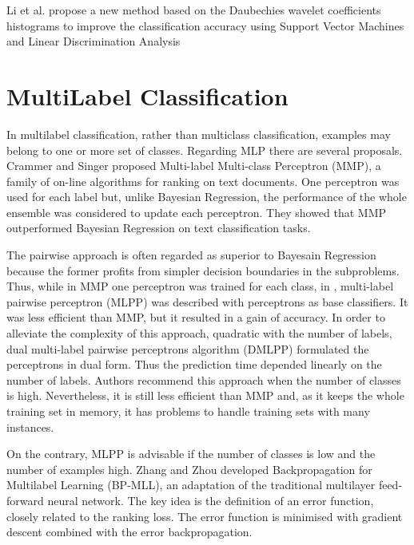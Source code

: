 Li et al. \cite{Li2003} propose a new method based on the Daubechies wavelet coefficients histograms
to improve the classification accuracy using Support Vector Machines and Linear Discrimination Analysis


\section{MultiLabel Classification}
\label{multilabelclassification}

In multilabel classification, rather than multiclass classification, 
examples may belong to one or more set of classes. Regarding MLP there are several proposals.
Crammer and Singer \cite{Crammer2003} proposed Multi-label Multi-class Perceptron (MMP), a
family of on-line algorithms for ranking on text documents. 
One perceptron was used for each label but, unlike Bayesian Regression, the performance of the whole ensemble
was considered to update each perceptron. They showed that MMP outperformed
Bayesian Regression on text classification tasks.

The pairwise approach is often regarded as superior to Bayesain Regression because the former profits from simpler decision boundaries in the subproblems. 
Thus, while in MMP one perceptron was trained for each class, in \cite{Mencia2009}, multi-label pairwise perceptron (MLPP) was described with perceptrons as base classifiers. 
It was less efficient than MMP, but it resulted in a gain of accuracy.
In order to alleviate the complexity of this approach, quadratic with the number of labels, dual multi-label pairwise perceptrons algorithm (DMLPP) \cite{LozaMencia2008} formulated the perceptrons in dual form. 
Thus the prediction time depended linearly on the number of labels. 
Authors recommend this approach when the number of classes is high. 
Nevertheless, it is still less efficient than MMP and, as it keeps the whole training set in memory, it has problems to
handle training sets with many instances. 


On the contrary, MLPP is advisable if the number of classes is low and the number of examples high. 
Zhang and Zhou \cite{Zhang2006} developed Backpropagation for Multilabel Learning (BP-MLL), an adaptation of
the traditional multilayer feed-forward neural network. The key idea is the definition of an error function, closely related to the ranking loss.
The error function is minimised with gradient descent combined with the error
backpropagation.

